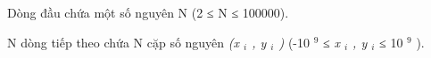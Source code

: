 Dòng đầu chứa một số nguyên       N      (2 ≤       N      ≤ 100000).  

       N      dòng tiếp theo chứa       N      cặp số nguyên   \textit{    (x    $_     i    $    , y    $_     i    $    )   }   (-10   $^    9   $   ≤   \textit{    x    $_     i    $    , y    $_     i    $}   ≤ 10   $^    9   $   ).  

\